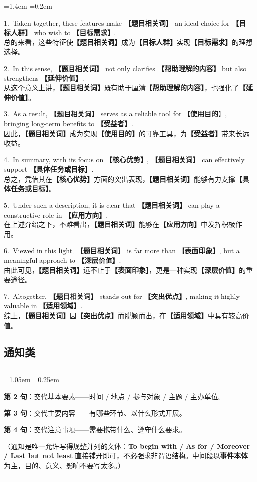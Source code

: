 \documentclass[11pt,a4paper]{ctexart}
\newcommand{\fillin}[1]{{\bfseries【#1】}}
\newcommand{\kw}[1]{{\bfseries\color{accent}#1}}
\newenvironment{tpl}[1]{%
  \par\addvspace{7pt}\needspace{4\baselineskip}%
  \noindent{\bfseries\color{accent}#1}\par\nopagebreak
  \vspace{2pt}\noindent\rule{\linewidth}{0.7pt}\par\nopagebreak\vspace{3pt}%
  \begin{list}{}{\leftmargin=1.05em \rightmargin=0.25em \listparindent=0pt
    \itemindent=0pt \topsep=0pt \parsep=2.5pt \itemsep=2.5pt \partopsep=0pt}%
  \item\relax
}{%
  \end{list}\vspace{1pt}\noindent\rule{\linewidth}{0.7pt}\par\addvspace{8pt}%
}
\newenvironment{eg}{%
  \par\addvspace{4pt}%
  \begin{list}{}{\leftmargin=1.4em \rightmargin=0.2em \listparindent=0pt
    \itemindent=0pt \topsep=0pt \parsep=2pt \itemsep=2pt \partopsep=0pt}%
  \item\relax
}{%
  \end{list}\addvspace{5pt}%
}
\begin{document}
\begin{eg}
1.\ Taken together, these features make \fillin{题目相关词} an ideal choice for \fillin{目标人群} who wish to \fillin{目标需求}.\\
总的来看，这些特征使\fillin{题目相关词}成为\fillin{目标人群}实现\fillin{目标需求}的理想选择。

2.\ In this sense, \fillin{题目相关词} not only clarifies \fillin{帮助理解的内容} but also strengthens \fillin{延伸价值}.\\
从这个意义上讲，\fillin{题目相关词}既有助于厘清\fillin{帮助理解的内容}，也强化了\fillin{延伸价值}。

3.\ As a result, \fillin{题目相关词} serves as a reliable tool for \fillin{使用目的}, bringing long-term benefits to \fillin{受益者}.\\
因此，\fillin{题目相关词}成为实现\fillin{使用目的}的可靠工具，为\fillin{受益者}带来长远收益。

4.\ In summary, with its focus on \fillin{核心优势}, \fillin{题目相关词} can effectively support \fillin{具体任务或目标}.\\
总之，凭借其在\fillin{核心优势}方面的突出表现，\fillin{题目相关词}能够有力支撑\fillin{具体任务或目标}。

5.\ Under such a description, it is clear that \fillin{题目相关词} can play a constructive role in \fillin{应用方向}.\\
在上述介绍之下，不难看出，\fillin{题目相关词}能够在\fillin{应用方向}中发挥积极作用。

6.\ Viewed in this light, \fillin{题目相关词} is far more than \fillin{表面印象}, but a meaningful approach to \fillin{深层价值}.\\
由此可见，\fillin{题目相关词}远不止于\fillin{表面印象}，更是一种实现\fillin{深层价值}的重要途径。

7.\ Altogether, \fillin{题目相关词} stands out for \fillin{突出优点}, making it highly valuable in \fillin{适用领域}.\\
综上，\fillin{题目相关词}因\fillin{突出优点}而脱颖而出，在\fillin{适用领域}中具有较高价值。
\end{eg}


\subsection{通知类}

\begin{tpl}{通知类 · 第二段骨架}
\textbf{第 2 句}：交代基本要素——时间 / 地点 / 参与对象 / 主题 / 主办单位。\par
\textbf{第 3 句}：交代主要内容——有哪些环节、以什么形式开展。\par
\textbf{第 4 句}：交代注意事项——需要携带什么、遵守什么要求。\par
（通知是唯一允许写得规整并列的文体：\kw{To begin with / As for / Moreover / Last but not least} 直接铺开即可，不必强求非谓语结构。中间段以\textbf{事件本体}为主，目的、意义、影响不要写太多。）
\end{tpl}
\end{document}
